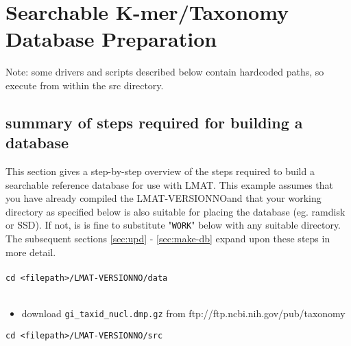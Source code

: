 \documentclass[11pt]{article}
\newcommand{\lmatver}{VERSIONNO}
\begin{document}
\section{Searchable K-mer/Taxonomy Database Preparation}


Note: some drivers and scripts described below contain hardcoded paths,
      so execute from within the src directory.

\subsection{summary of steps required for building a database} 
This section gives a step-by-step overview of the steps required to build a searchable reference database for use with LMAT.
This example assumes that you have already compiled the LMAT-\lmatver and that your working directory as specified below is also suitable for placing the database (eg. ramdisk or SSD).  If not, is is fine to substitute "\texttt{WORK}" below with any suitable directory.  The subsequent sections \ref{sec:upd} - \ref{sec:make-db} expand upon these steps in more detail.\\
\\
\texttt{cd <filepath>/LMAT-\lmatver/data}\\
\\
\begin{itemize}
\item
download \texttt{gi\_taxid\_nucl.dmp.gz} from ftp://ftp.ncbi.nih.gov/pub/taxonomy
\end{itemize}
\texttt{cd <filepath>/LMAT-\lmatver/src}\\
\end{document}
